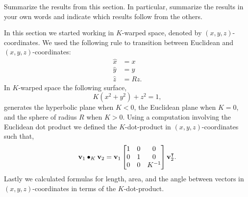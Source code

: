 \documentclass[newpage,hints,handout]{ximera}
\begin{document}


\begin{problem}
Summarize the results from this section. In particular, summarize the results in your own words and indicate which
results follow from the others.
\begin{freeResponse}
In this section we started working in $K$-warped space, denoted by $(x, y, z)$-coordinates. We used the following rule to transition between Euclidean and  $(x, y, z)$-coordinates:
\begin{align*}
\hat{x}  &  =x\\
\hat{y}  &  =y\\
\hat{z}  &  =Rz.
\end{align*}
In $K$-warped space the following surface,
\[
K\left(x^{2}+y^{2}\right)+z^{2}=1,
\]
 generates the hyperbolic plane when $K<0$, the Euclidean plane when $K=0$, and the sphere of radius $R$ when $K> 0$. Using a computation involving the Euclidean dot product we defined the $K$-dot-product in $(x, y, z)$-coordinates such that,
\[
\mathbf{v}_{1}\bullet_{K}\mathbf{v}_{2}  = \mathbf{v}_{1} 
\begin{bmatrix}
1 & 0 & 0\\
0 & 1 & 0\\
0 & 0 & K^{-1}%
\end{bmatrix}
\mathbf{v}_{2}^\transpose.
\]
Lastly we calculated formulas for length, area, and the angle between vectors in $(x,y,z)$-coordinates in terms of the $K$-dot-product.
\end{freeResponse}
\end{problem}
\end{document}
